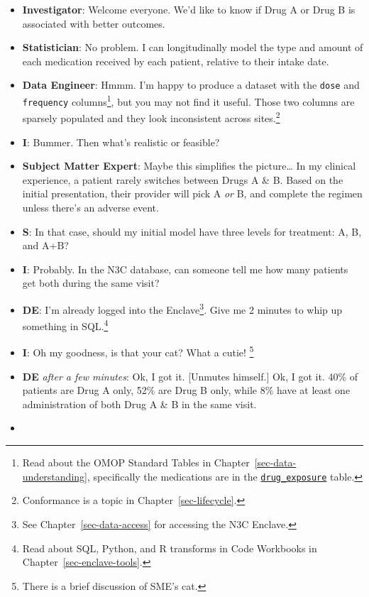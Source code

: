 \documentclass[
  letterpaper,
  DIV=11,
  numbers=noendperiod]{scrreprt}
\providecommand{\tightlist}{%
  \setlength{\itemsep}{0pt}\setlength{\parskip}{0pt}}\usepackage{longtable,booktabs,array}
\begin{document}
\begin{itemize}
\tightlist
\item
  \textbf{Investigator}: Welcome everyone. We'd like to know if Drug A
  or Drug B is associated with better outcomes.
\item
  \textbf{Statistician}: No problem. I can longitudinally model the type
  and amount of each medication received by each patient, relative to
  their intake date.
\item
  \textbf{Data Engineer}: Hmmm. I'm happy to produce a dataset with the
  \texttt{dose} and \texttt{frequency} columns\footnote{Read about the
    OMOP Standard Tables in Chapter~\ref{sec-data-understanding},
    specifically the medications are in the
    \href{https://ohdsi.github.io/CommonDataModel/cdm60.html\#DRUG_EXPOSURE}{\texttt{drug\_exposure}}
    table.}, but you may not find it useful. Those two columns are
  sparsely populated and they look inconsistent across sites.\footnote{Conformance
    is a topic in Chapter~\ref{sec-lifecycle}.}
\item
  \textbf{I}: Bummer. Then what's realistic or feasible?
\item
  \textbf{Subject Matter Expert}: Maybe this simplifies the
  picture\ldots{} In my clinical experience, a patient rarely switches
  between Drugs A \& B. Based on the initial presentation, their
  provider will pick A \emph{or} B, and complete the regimen unless
  there's an adverse event.
\item
  \textbf{S}: In that case, should my initial model have three levels
  for treatment: A, B, and A+B?
\item
  \textbf{I}: Probably. In the N3C database, can someone tell me how
  many patients get both during the same visit?
\item
  \textbf{DE}: I'm already logged into the Enclave\footnote{See
    Chapter~\ref{sec-data-access} for accessing the N3C Enclave.}. Give
  me 2 minutes to whip up something in SQL.\footnote{Read about SQL,
    Python, and R transforms in Code Workbooks in
    Chapter~\ref{sec-enclave-tools}.}
\item
  \textbf{I}: Oh my goodness, is that your cat? What a cutie!
  \footnote{There is a brief discussion of SME's cat.}
\item
  \textbf{DE} \emph{after a few minutes}: Ok, I got it. {[}Unmutes
  himself.{]} Ok, I got it. 40\% of patients are Drug A only, 52\% are
  Drug B only, while 8\% have at least one administration of both Drug A
  \& B in the same visit.
\item

\end{itemize}
\end{document}
